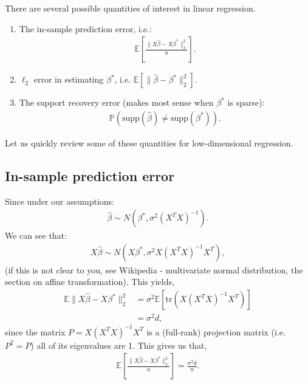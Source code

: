 \documentclass[twoside,12pt]{article}
\newcommand{\inprod}[2]{\ensuremath{\langle #1 , \, #2 \rangle}}
\begin{document}
There are several possible quantities of interest in linear regression. 
\begin{enumerate}
\item The in-sample prediction error, i.e.:
\begin{align*}
\mathbb{E} \left[ \frac{\|X \widehat{\beta} - X \beta^*\|_2^2}{n}\right].
\end{align*}
\item $\ell_2$ error in estimating $\beta^*$, i.e. $\mathbb{E}[ \|\widehat{\beta} - \beta^*\|_2^2].$
\item The support recovery error (makes most sense when $\beta^*$ is sparse): 
\begin{align*}
\mathbb{P}( \text{supp}(\widehat{\beta}) \neq \text{supp}(\beta^*)).
\end{align*}
\end{enumerate}
Let us quickly review some of these quantities for low-dimensional regression.

\subsection{In-sample prediction error}
Since under our assumptions:
\begin{align*}
\widehat{\beta} \sim N(\beta^*, \sigma^2 (X^T X)^{-1}).
\end{align*}
We can see that:
\begin{align*}
X\widehat{\beta} \sim N(X\beta^*, \sigma^2 X(X^T X)^{-1} X^T),
\end{align*}
(if this is not clear to you, see Wikipedia - multivariate normal distribution, the section on affine transformation).
This yields,
\begin{align*}
\mathbb{E} \|X\widehat{\beta} - X\beta^*\|_2^2 &= \sigma^2 \mathbb{E} \left[\mathrm{tr}(X(X^T X)^{-1} X^T)\right] \\
&= \sigma^2 d,
\end{align*}
since the matrix $P = X(X^TX)^{-1}X^{T}$ is a (full-rank) projection matrix (i.e. $P^2 = P$) all of its eigenvalues are 1. This gives us that,
\begin{align*}
\mathbb{E} \left[ \frac{\|X\widehat{\beta} - X\beta^*\|_2^2}{n} \right] = \frac{\sigma^2 d}{n}.
\end{align*}
\end{document}

